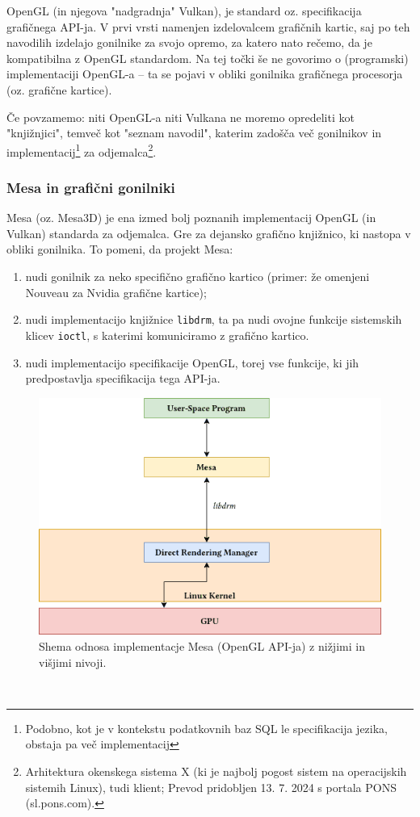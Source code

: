 \documentclass{article}
\begin{document}
OpenGL (in njegova "nadgradnja" Vulkan), je standard oz. specifikacija \autocite{openglfaq} grafičnega API-ja. V prvi vrsti namenjen izdelovalcem grafičnih kartic, saj po teh navodilih izdelajo gonilnike za svojo opremo, za katero nato rečemo, da je kompatibilna z OpenGL standardom. Na tej točki še ne govorimo o (programski) implementaciji OpenGL-a -- ta se pojavi v obliki gonilnika grafičnega procesorja (oz. grafične kartice).

Če povzamemo: niti OpenGL-a niti Vulkana ne moremo opredeliti kot "knjižnjici", temveč kot "seznam navodil", katerim zadošča več gonilnikov in implementacij\footnote{Podobno, kot je v kontekstu podatkovnih baz SQL le specifikacija jezika, obstaja pa več implementacij} za odjemalca\footnote{Arhitektura okenskega sistema X (ki je najbolj pogost sistem na operacijskih sistemih Linux), tudi klient; Prevod pridobljen 13. 7. 2024 s portala PONS (sl.pons.com).}. 

\subsubsection{Mesa in grafični gonilniki}

Mesa (oz. Mesa3D) \autocite{mesadocs} je ena izmed bolj poznanih implementacij OpenGL (in Vulkan) standarda za odjemalca. Gre za dejansko grafično knjižnico, ki nastopa v obliki gonilnika. To pomeni, da projekt Mesa:

\begin{enumerate}
    \item nudi gonilnik za neko specifično grafično kartico (primer: že omenjeni Nouveau za Nvidia grafične kartice);
    \item nudi implementacijo knjižnice \texttt{libdrm}, ta pa nudi ovojne funkcije sistemskih klicev \texttt{ioctl}, s katerimi komuniciramo z grafično kartico. 
    \item nudi implementacijo specifikacije OpenGL, torej vse funkcije, ki jih predpostavlja specifikacija tega API-ja.
\end{enumerate}

\begin{figure}
    \vspace*{10pt}
    \centering
    \includegraphics[width=0.8\linewidth]{Mesa}
    \caption{Shema odnosa implementacje Mesa (OpenGL API-ja) z nižjimi in višjimi nivoji. \autocite{baeldunggui}}
\end{figure}
\
\end{document}
